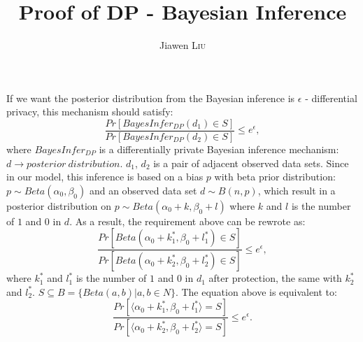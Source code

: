 \documentclass{article}
\title{\textbf{Proof of DP - Bayesian Inference}\\
}
\author{Jiawen \textsc{Liu}} %
\begin{document}
\maketitle %



If we want the posterior distribution from the Bayesian inference is $\epsilon$ - differential privacy, this mechanism should satisfy:
\begin{equation*}
\frac{Pr[BayesInfer_{DP}(d_1) \in S]}{Pr[BayesInfer_{DP}(d_2) \in S]} \leq e^{\epsilon},
\end{equation*}
where $BayesInfer_{DP}$ is a differentially private Bayesian inference mechanism: $d \rightarrow posterior\ distribution$. $d_1$, $d_2$ is a pair of adjacent observed data sets. Since in our model, this inference is based on a bias $p$ with beta prior distribution: $p \sim Beta(\alpha_0, \beta_0)$ and an observed data set $d \sim B(n,p)$, which result in a posterior distribution on $p \sim Beta(\alpha_0 + k, \beta_0 + l)$ where $k$ and $l$ is the number of $1$ and $0$ in $d$. As a result, the requirement above can be rewrote as:
\begin{equation*}
\frac{Pr[Beta(\alpha_0 + k^*_1, \beta_0 + l^*_1) \in S]}{Pr[Beta(\alpha_0 + k^*_2, \beta_0 + l^*_2) \in S]} \leq e^{\epsilon},
\end{equation*}
where $k^*_1$ and $l^*_1$ is the number of $1$ and $0$ in $d_1$ after protection, the same with $k^*_2$ and $l^*_2$.  $S\subseteq B = \{Beta(a,b) | a,b \in N\}$. The equation above is equivalent to:
\begin{equation*}
\frac{Pr[\langle \alpha_0 + k^*_1, \beta_0 + l^*_1 \rangle = S]}{Pr[ \langle \alpha_0 + k^*_2, \beta_0 + l^*_2 \rangle = S]} \leq e^{\epsilon}.
\end{equation*}
\end{document}

